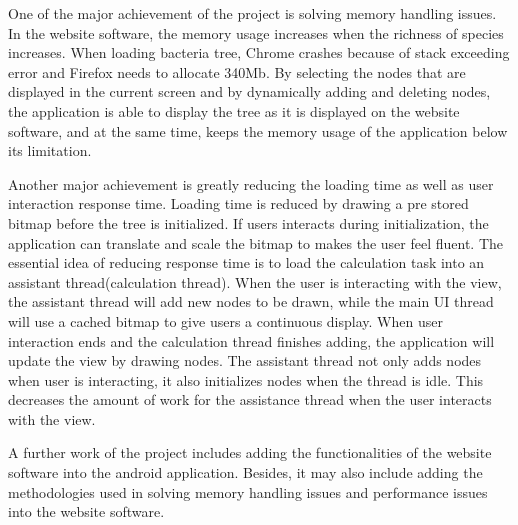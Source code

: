 \documentclass[a4paper,11pt,twoside]{report}
\begin{document}
One of the major achievement of the project is solving memory handling issues. In the website software, the memory usage increases when the richness of species increases. When loading bacteria tree, Chrome crashes because of stack exceeding error and Firefox needs to allocate 340Mb. By selecting the nodes that are displayed in the current screen and by dynamically adding and deleting nodes, the application is able to display the tree as it is displayed on the website software, and at the same time, keeps the memory usage of the application below its limitation.

Another major achievement is greatly reducing the loading time as well as user interaction response time. Loading time is reduced by drawing a pre stored bitmap before the tree is initialized. If users interacts during initialization, the application can translate and scale the bitmap to makes the user feel fluent. The essential idea of reducing response time is to load the calculation task into an assistant thread(calculation thread). When the user is interacting with the view, the assistant thread will add new nodes to be drawn, while the main UI thread will use a cached bitmap to give users a continuous display. When user interaction ends and the calculation thread finishes adding, the application will update the view by drawing nodes. The assistant thread not only adds nodes when user is interacting, it also initializes nodes when the thread is idle. This decreases the amount of work for the assistance thread when the user interacts with the view.

A further work of the project includes adding the functionalities of the website software into the android application. Besides, it may also include adding the methodologies used in solving memory handling issues and performance issues into the website software.






{}

\end{document}
